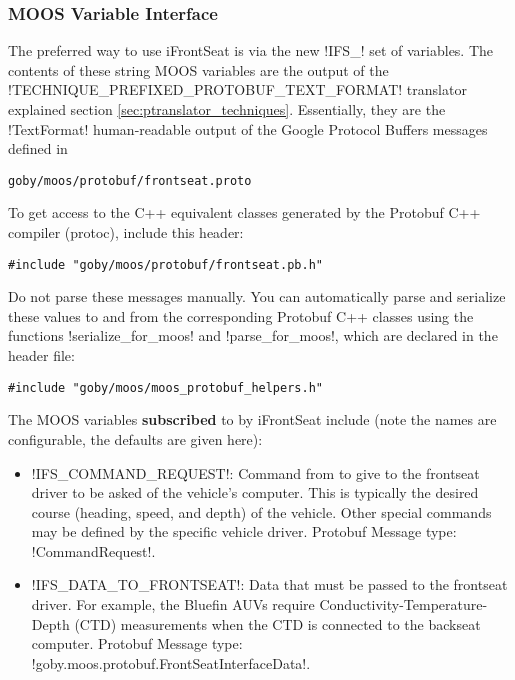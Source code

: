 \subsubsection{MOOS Variable Interface}

The preferred way to use iFrontSeat is via the new !IFS_! set of variables. The contents of these string MOOS variables are the output of the !TECHNIQUE_PREFIXED_PROTOBUF_TEXT_FORMAT! translator explained section \ref{sec:ptranslator_techniques}. Essentially, they are the !TextFormat! human-readable output of the Google Protocol Buffers messages defined in
\begin{verbatim}
goby/moos/protobuf/frontseat.proto
\end{verbatim}

To get access to the C++ equivalent classes generated by the Protobuf C++ compiler (protoc), include this header:
\begin{verbatim}
#include "goby/moos/protobuf/frontseat.pb.h"
\end{verbatim}

Do not parse these messages manually. You can automatically parse and serialize these values to and from the corresponding Protobuf C++ classes using the functions !serialize_for_moos! and !parse_for_moos!, which are declared in the header file:
\begin{verbatim}
#include "goby/moos/moos_protobuf_helpers.h" 
\end{verbatim}

The MOOS variables \textbf{subscribed} to by iFrontSeat include (note the names are configurable, the defaults are given here):
\begin{itemize}
\item !IFS_COMMAND_REQUEST!: Command from to give to the frontseat driver to be asked of the vehicle's computer. This is typically the desired course (heading, speed, and depth) of the vehicle. Other special commands may be defined by the specific vehicle driver. Protobuf Message type:  !CommandRequest!.
\item !IFS_DATA_TO_FRONTSEAT!: Data that must be passed to the frontseat driver. For example, the Bluefin AUVs require Conductivity-Temperature-Depth (CTD) measurements when the CTD is connected to the backseat computer. Protobuf Message type: !goby.moos.protobuf.FrontSeatInterfaceData!.
\end{itemize}

